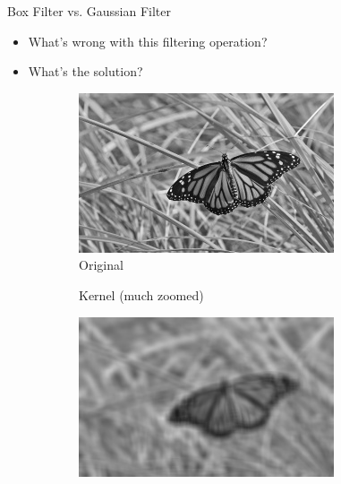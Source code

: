 \begin{frame}{Box Filter vs. Gaussian Filter}
    \begin{itemize}
        \item What's wrong with this filtering operation?
        \item What's the solution?
    \end{itemize}
    \begin{figure}
        \centering
        \begin{subfigure}[b]{0.3\textwidth}
            \includegraphics[width=\textwidth]{./figures/box_vs_gaussian_original.jpg}
            \caption{Original}
            \label{sfi:box_vs_gaussian_original}
        \end{subfigure}
        \begin{subfigure}[b]{0.3\textwidth}
            \centering
            \caption{Kernel (much zoomed)}
            \label{sfi:box_vs_gaussian_kernel}
        \end{subfigure}
        \begin{subfigure}[b]{0.3\textwidth}
            \includegraphics[width=\textwidth]{./figures/box_vs_gaussian_box.jpg}

\end{subfigure}
\end{figure}
\end{frame}

